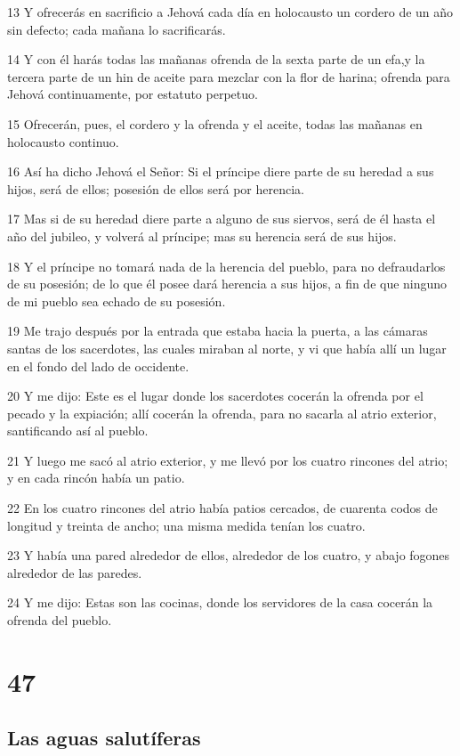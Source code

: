 \par 13 Y ofrecerás en sacrificio a Jehová cada día en holocausto un cordero de un año sin defecto; cada mañana lo sacrificarás.
\par 14 Y con él harás todas las mañanas ofrenda de la sexta parte de un efa,y la tercera parte de un hin de aceite para mezclar con la flor de harina; ofrenda para Jehová continuamente, por estatuto perpetuo.
\par 15 Ofrecerán, pues, el cordero y la ofrenda y el aceite, todas las mañanas en holocausto continuo.
\par 16 Así ha dicho Jehová el Señor: Si el príncipe diere parte de su heredad a sus hijos, será de ellos; posesión de ellos será por herencia.
\par 17 Mas si de su heredad diere parte a alguno de sus siervos, será de él hasta el año del jubileo, y volverá al príncipe; mas su herencia será de sus hijos.
\par 18 Y el príncipe no tomará nada de la herencia del pueblo, para no defraudarlos de su posesión; de lo que él posee dará herencia a sus hijos, a fin de que ninguno de mi pueblo sea echado de su posesión.
\par 19 Me trajo después por la entrada que estaba hacia la puerta, a las cámaras santas de los sacerdotes, las cuales miraban al norte, y vi que había allí un lugar en el fondo del lado de occidente.
\par 20 Y me dijo: Este es el lugar donde los sacerdotes cocerán la ofrenda por el pecado y la expiación; allí cocerán la ofrenda, para no sacarla al atrio exterior, santificando así al pueblo.
\par 21 Y luego me sacó al atrio exterior, y me llevó por los cuatro rincones del atrio; y en cada rincón había un patio.
\par 22 En los cuatro rincones del atrio había patios cercados, de cuarenta codos de longitud y treinta de ancho; una misma medida tenían los cuatro.
\par 23 Y había una pared alrededor de ellos, alrededor de los cuatro, y abajo fogones alrededor de las paredes.
\par 24 Y me dijo: Estas son las cocinas, donde los servidores de la casa cocerán la ofrenda del pueblo.

\chapter{47}

\section*{Las aguas salutíferas}


